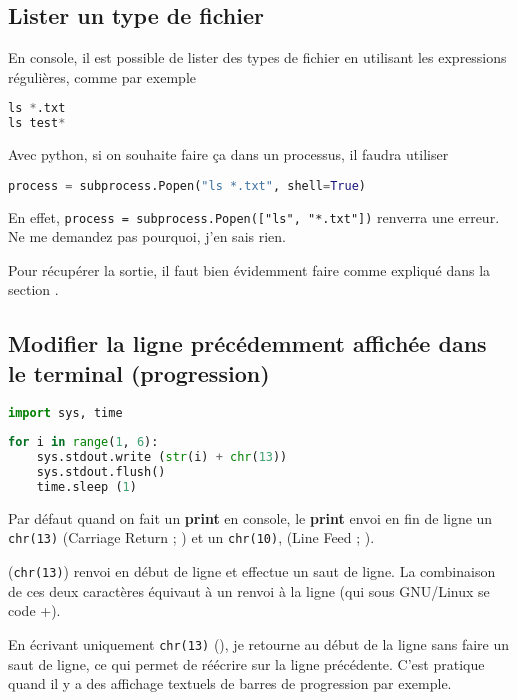 \documentclass[a4paper,twoside]{article}
\begin{document}
\subsection{Lister un type de fichier}
En console, il est possible de lister des types de fichier en utilisant les expressions régulières, comme par exemple
\begin{lstlisting}[language=python]
ls *.txt
ls test*
\end{lstlisting}

Avec python, si on souhaite faire ça dans un processus, il faudra utiliser
\begin{lstlisting}[language=python]
process = subprocess.Popen("ls *.txt", shell=True)
\end{lstlisting}

En effet, \verb|process = subprocess.Popen(["ls", "*.txt"])| renverra une erreur. Ne me demandez pas pourquoi, j'en sais rien.

\begin{remarque}
Pour récupérer la sortie, il faut bien évidemment faire comme expliqué dans la section .
\end{remarque}

\subsection{Modifier la ligne précédemment affichée dans le terminal (progression)}	
\begin{lstlisting}[language=python]
import sys, time
 
for i in range(1, 6):
    sys.stdout.write (str(i) + chr(13))
    sys.stdout.flush()
    time.sleep (1)
\end{lstlisting}


Par défaut quand on fait un \textbf{print} en console, le \textbf{print} envoi en fin de ligne un \texttt{chr(13)} (Carriage Return ; ) et un \texttt{chr(10)}, (Line Feed ; ).

 (\texttt{chr(13)}) renvoi en début de ligne et  effectue un saut de ligne. La combinaison de ces deux caractères équivaut à un renvoi à la ligne (qui sous GNU/Linux se code +).

En écrivant uniquement \texttt{chr(13)} (), je retourne au début de la ligne sans faire un saut de ligne, ce qui permet de réécrire sur la ligne précédente. C'est pratique quand il y a des affichage textuels de barres de progression par exemple.
\end{document}
